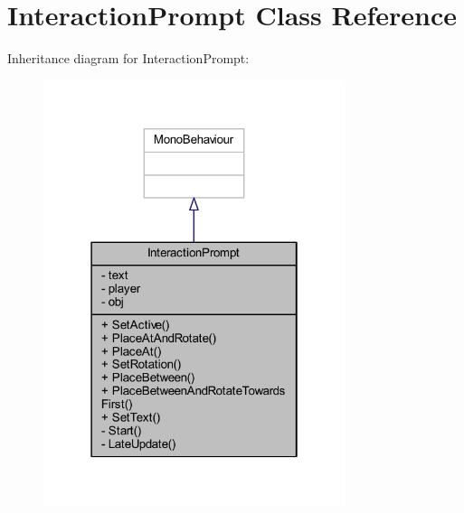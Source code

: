 \hypertarget{class_interaction_prompt}{}\section{Interaction\+Prompt Class Reference}
\label{class_interaction_prompt}


Inheritance diagram for Interaction\+Prompt\+:
\nopagebreak
\begin{figure}[H]
\begin{center}
\leavevmode
\includegraphics[width=250pt]{class_interaction_prompt__inherit__graph}
\end{center}
\end{figure}


